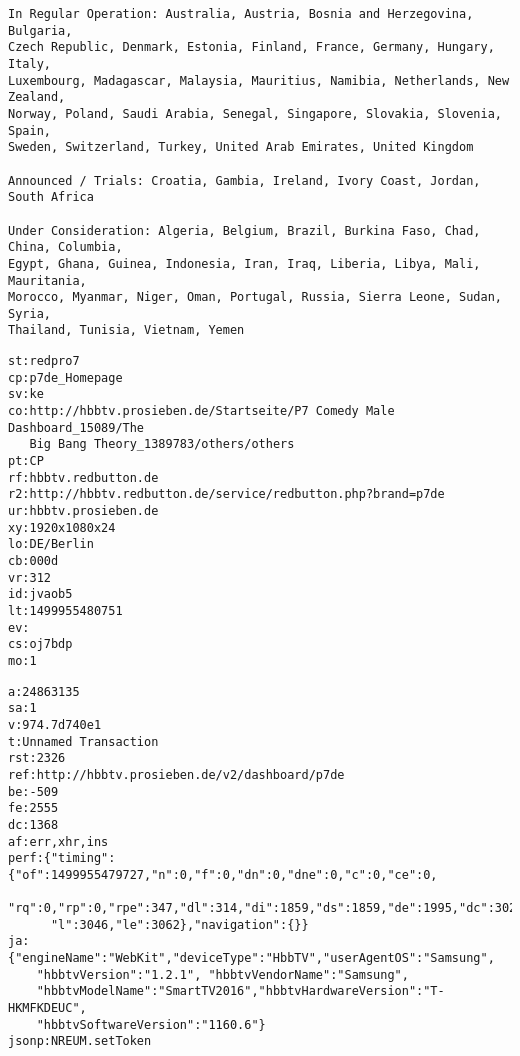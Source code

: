 
\begin{appendix}

\begin{lstlisting}
In Regular Operation: Australia, Austria, Bosnia and Herzegovina, Bulgaria,
Czech Republic, Denmark, Estonia, Finland, France, Germany, Hungary, Italy,
Luxembourg, Madagascar, Malaysia, Mauritius, Namibia, Netherlands, New Zealand,
Norway, Poland, Saudi Arabia, Senegal, Singapore, Slovakia, Slovenia, Spain,
Sweden, Switzerland, Turkey, United Arab Emirates, United Kingdom

Announced / Trials: Croatia, Gambia, Ireland, Ivory Coast, Jordan, South Africa

Under Consideration: Algeria, Belgium, Brazil, Burkina Faso, Chad, China, Columbia,
Egypt, Ghana, Guinea, Indonesia, Iran, Iraq, Liberia, Libya, Mali, Mauritania,
Morocco, Myanmar, Niger, Oman, Portugal, Russia, Sierra Leone, Sudan, Syria,
Thailand, Tunisia, Vietnam, Yemen
\end{lstlisting}

\vspace{1cm}

\begin{lstlisting}
st:redpro7
cp:p7de_Homepage
sv:ke
co:http://hbbtv.prosieben.de/Startseite/P7 Comedy Male Dashboard_15089/The
   Big Bang Theory_1389783/others/others
pt:CP
rf:hbbtv.redbutton.de
r2:http://hbbtv.redbutton.de/service/redbutton.php?brand=p7de
ur:hbbtv.prosieben.de
xy:1920x1080x24
lo:DE/Berlin
cb:000d
vr:312
id:jvaob5
lt:1499955480751
ev:
cs:oj7bdp
mo:1
\end{lstlisting}

\newpage

\begin{lstlisting}
a:24863135
sa:1
v:974.7d740e1
t:Unnamed Transaction
rst:2326
ref:http://hbbtv.prosieben.de/v2/dashboard/p7de
be:-509
fe:2555
dc:1368
af:err,xhr,ins
perf:{"timing":{"of":1499955479727,"n":0,"f":0,"dn":0,"dne":0,"c":0,"ce":0,
      "rq":0,"rp":0,"rpe":347,"dl":314,"di":1859,"ds":1859,"de":1995,"dc":3020,
      "l":3046,"le":3062},"navigation":{}}
ja:{"engineName":"WebKit","deviceType":"HbbTV","userAgentOS":"Samsung",
    "hbbtvVersion":"1.2.1", "hbbtvVendorName":"Samsung",
    "hbbtvModelName":"SmartTV2016","hbbtvHardwareVersion":"T-HKMFKDEUC",
    "hbbtvSoftwareVersion":"1160.6"}
jsonp:NREUM.setToken
\end{lstlisting}


\end{appendix}
